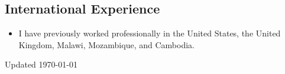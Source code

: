 \documentclass{academiccv}
\begin{document}
\subsection*{International Experience}

\begin{itemize}
	
\item I have previously worked professionally in the United States, the United Kingdom, Malawi, Mozambique, and Cambodia.

\end{itemize}



\begin{center}
\vspace{6em}
Updated \monthyeardate\today
\end{center}
\end{document}
